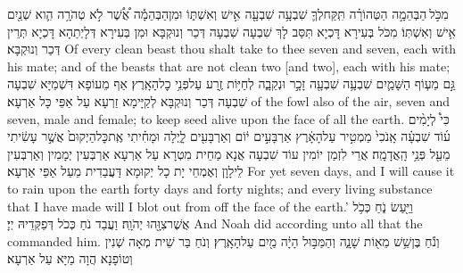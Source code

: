 {מִכֹּ֣ל \legarmeh  הַבְּהֵמָ֣ה הַטְּהוֹרָ֗ה תִּֽקַּח\maqqaf לְךָ֛ שִׁבְעָ֥ה שִׁבְעָ֖ה אִ֣ישׁ וְאִשְׁתּ֑וֹ וּמִן\maqqaf הַבְּהֵמָ֡ה אֲ֠שֶׁ֠ר לֹ֣א טְהֹרָ֥ה הִ֛וא שְׁנַ֖יִם אִ֥ישׁ וְאִשְׁתּֽוֹ׃}
{מִכֹּל בְּעִירָא דָּכְיָא תִּסַּב לָךְ שִׁבְעָה שִׁבְעָה דְּכַר וְנוּקְבָּא וּמִן בְּעִירָא דְּלָיְתַהָא דָּכְיָא תְּרֵין דְּכַר וְנוּקְבָּא׃}
{Of every clean beast thou shalt take to thee seven and seven, each with his mate; and of the beasts that are not clean two [and two], each with his mate;}{}
{גַּ֣ם מֵע֧וֹף הַשָּׁמַ֛יִם שִׁבְעָ֥ה שִׁבְעָ֖ה זָכָ֣ר וּנְקֵבָ֑ה לְחַיּ֥וֹת זֶ֖רַע עַל\maqqaf פְּנֵ֥י כׇל\maqqaf הָאָֽרֶץ׃}
{אַף מֵעוֹפָא דִּשְׁמַיָּא שִׁבְעָה שִׁבְעָה דְּכַר וְנוּקְבָּא לְקַיָּימָא זַרְעָא עַל אַפֵּי כָּל אַרְעָא׃}
{of the fowl also of the air, seven and seven, male and female; to keep seed alive upon the face of all the earth.}{}
{כִּי֩ לְיָמִ֨ים ע֜וֹד שִׁבְעָ֗ה אָֽנֹכִי֙ מַמְטִ֣יר עַל\maqqaf הָאָ֔רֶץ אַרְבָּעִ֣ים י֔וֹם וְאַרְבָּעִ֖ים לָ֑יְלָה וּמָחִ֗יתִי אֶֽת\maqqaf כׇּל\maqqaf הַיְקוּם֙ אֲשֶׁ֣ר עָשִׂ֔יתִי מֵעַ֖ל פְּנֵ֥י הָֽאֲדָמָֽה׃}
{אֲרֵי לִזְמַן יוֹמִין עוֹד שִׁבְעָה אֲנָא מַחֵית מִטְרָא עַל אַרְעָא אַרְבְּעִין יְמָמִין וְאַרְבְּעִין לֵילָוָן וְאֶמְחֵי יָת כָל יְקוּמָא דַּעֲבַדִית מֵעַל אַפֵּי אַרְעָא׃}
{For yet seven days, and I will cause it to rain upon the earth forty days and forty nights; and every living substance that I have made will I blot out from off the face of the earth.’}{}
{וַיַּ֖עַשׂ נֹ֑חַ כְּכֹ֥ל אֲשֶׁר\maqqaf צִוָּ֖הוּ יְהֹוָֽה׃}
{וַעֲבַד נֹחַ כְּכֹל דְּפַקְּדֵיהּ יְיָ׃}
{And Noah did according unto all that the \lord\space commanded him.}{}
{וְנֹ֕חַ בֶּן\maqqaf שֵׁ֥שׁ מֵא֖וֹת שָׁנָ֑ה וְהַמַּבּ֣וּל הָיָ֔ה מַ֖יִם עַל\maqqaf הָאָֽרֶץ׃}
{וְנֹחַ בַּר שֵׁית מְאָה שְׁנִין וְטוֹפָנָא הֲוָה מַיָּא עַל אַרְעָא׃}
